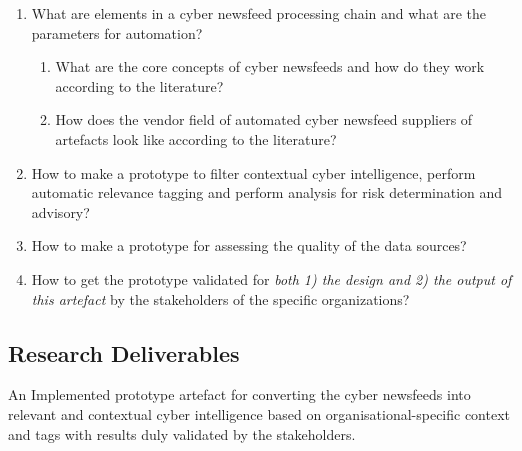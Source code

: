 \begin{enumerate}
    \item What are elements in a cyber newsfeed processing chain and what are the parameters for automation?
    \begin{enumerate}
        \item What are the core concepts of cyber newsfeeds and how do they work according to the literature?
        
        \item How does the vendor field of automated cyber newsfeed suppliers of artefacts look like according to the literature?
    \end{enumerate}
    

    \item How to make a prototype to filter contextual cyber intelligence, perform automatic relevance tagging and perform analysis for risk determination and advisory?
    
    \item How to make a prototype for assessing the quality of the data sources?
    
    \item How to get the prototype validated for \emph{both 1) the design and 2) the output of this artefact} by the stakeholders of the specific organizations?
\end{enumerate}


\subsection{Research Deliverables}
An Implemented prototype artefact
for converting the cyber newsfeeds  
into relevant and contextual cyber intelligence 
based on  organisational-specific context 
and tags 
with results duly validated by the stakeholders.

